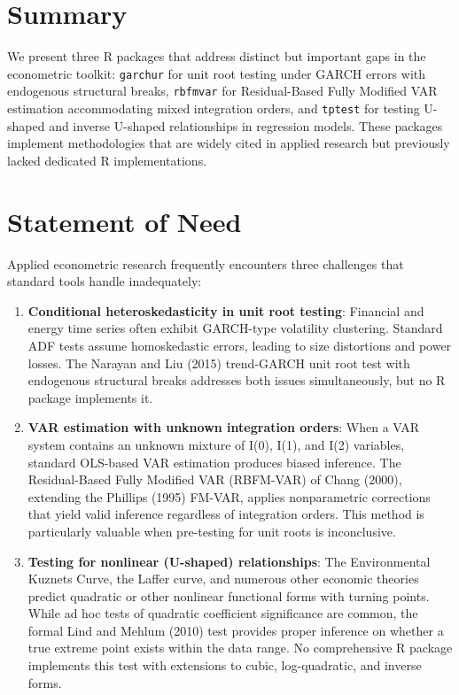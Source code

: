 \section{Summary}\label{summary}

We present three R packages that address distinct but important gaps in
the econometric toolkit: \texttt{garchur} for unit root testing under
GARCH errors with endogenous structural breaks, \texttt{rbfmvar} for
Residual-Based Fully Modified VAR estimation accommodating mixed
integration orders, and \texttt{tptest} for testing U-shaped and inverse
U-shaped relationships in regression models. These packages implement
methodologies that are widely cited in applied research but previously
lacked dedicated R implementations.

\section{Statement of Need}\label{statement-of-need}

Applied econometric research frequently encounters three challenges that
standard tools handle inadequately:

\begin{enumerate}
\def\labelenumi{\arabic{enumi}.}
\item
  \textbf{Conditional heteroskedasticity in unit root testing}:
  Financial and energy time series often exhibit GARCH-type volatility
  clustering. Standard ADF tests assume homoskedastic errors, leading to
  size distortions and power losses. The Narayan and Liu (2015)
  trend-GARCH unit root test with endogenous structural breaks addresses
  both issues simultaneously, but no R package implements it.
\item
  \textbf{VAR estimation with unknown integration orders}: When a VAR
  system contains an unknown mixture of I(0), I(1), and I(2) variables,
  standard OLS-based VAR estimation produces biased inference. The
  Residual-Based Fully Modified VAR (RBFM-VAR) of Chang (2000),
  extending the Phillips (1995) FM-VAR, applies nonparametric
  corrections that yield valid inference regardless of integration
  orders. This method is particularly valuable when pre-testing for unit
  roots is inconclusive.
\item
  \textbf{Testing for nonlinear (U-shaped) relationships}: The
  Environmental Kuznets Curve, the Laffer curve, and numerous other
  economic theories predict quadratic or other nonlinear functional
  forms with turning points. While ad hoc tests of quadratic coefficient
  significance are common, the formal Lind and Mehlum (2010) test
  provides proper inference on whether a true extreme point exists
  within the data range. No comprehensive R package implements this test
  with extensions to cubic, log-quadratic, and inverse forms.
\end{enumerate}

